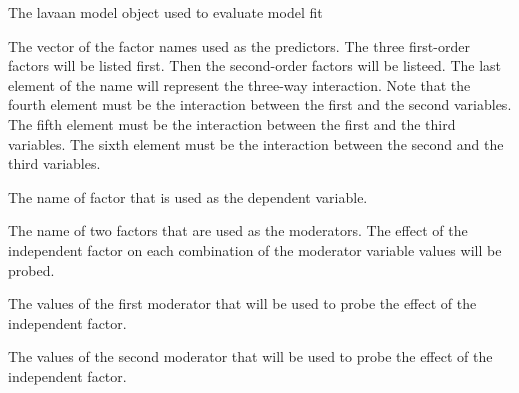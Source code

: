 \documentclass[a4paper]{book}
\begin{document}
%
\begin{Arguments}
\begin{ldescription}
\item[\code{fit}] The lavaan model object used to evaluate model fit
\item[\code{nameX}] The vector of the factor names used as the predictors. The three first-order factors will be listed first. Then the second-order factors will be listeed. The last element of the name will represent the three-way interaction. Note that the fourth element must be the interaction between the first and the second variables. The fifth element must be the interaction between the first and the third variables. The sixth element must be the interaction between the second and the third variables.
\item[\code{nameY}] The name of factor that is used as the dependent variable.
\item[\code{modVar}] The name of two factors that are used as the moderators. The effect of the independent factor on each combination of the moderator variable values will be probed.
\item[\code{valProbe1}] The values of the first moderator that will be used to probe the effect of the independent factor.
\item[\code{valProbe2}] The values of the second moderator that will be used to probe the effect of the independent factor.
\end{ldescription}
\end{Arguments}
%
\end{document}

